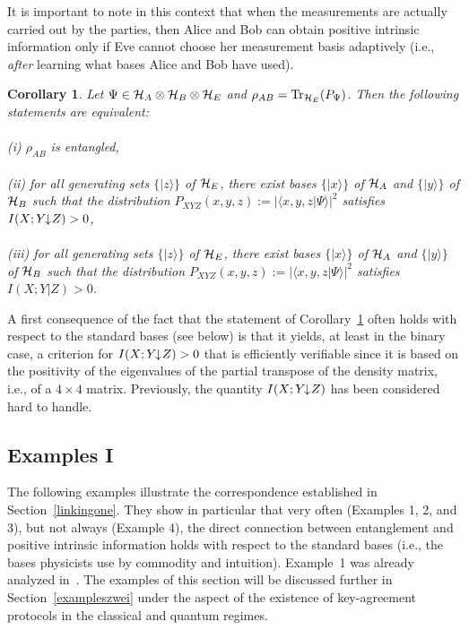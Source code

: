 \documentclass{article}
\newtheorem{cor}[theo]{Corollary}
\newcommand{\Tr}{{\rm Tr}}
\newcommand{\HA}{{\cal H}_{{A}}}
\newcommand{\HB}{{\cal H}_{{B}}}
\newcommand{\HE}{{\cal H}_{{E}}}
\newcommand{\ida}{I(X;Y\hspace{-1.3mm}\downarrow\hspace{-0.8mm} Z)}
\begin{document}
It is important to note in this context that when the measurements 
are actually carried out by the parties, then Alice and Bob can 
obtain positive intrinsic information only  if Eve cannot 
choose her measurement basis adaptively 
(i.e., {\em after\/} learning what bases
Alice and Bob have used). 


\begin{cor}\label{coreinszwei}
Let $\Psi\in\HA\otimes\HB\otimes\HE$ and $\rho_{AB}=\Tr_{\HE}(P_{\Psi})$.
Then the following statements
are equivalent:
\\ \ \\
\quad
{\it (i)}
$\rho_{AB}$ is entangled,
\\ \ \\
\quad
{\it (ii)}
for all generating sets $\{|z\rangle\}$ of $\HE$, there exist bases
$\{|x\rangle\}$ of $\HA$ and 
$\{|y\rangle\}$ of  $\HB$ such that the 
distribution  $P_{XYZ}(x,y,z):=|\langle x,y,z|\Psi\rangle|^2$ satisfies 
$\ida>0$,
\\ \ \\
\quad
{\it (iii)}
for all generating sets  $\{|z\rangle\}$ of $\HE$, there exist bases
$\{|x\rangle\}$ of $\HA$
and $\{|y\rangle\}$ of  $\HB$ such that the 
distribution  $P_{XYZ}(x,y,z):=|\langle x,y,z|\Psi\rangle|^2$ satisfies 
$I(X;Y|Z)>0$.
\end{cor}


A first consequence of the fact that the statement of 
Corollary~\ref{coreinszwei} often holds
with respect to the standard bases (see below) is that it yields, at least 
in the binary case, a criterion for $\ida>0$ that is efficiently verifiable 
since it is based on the positivity of the eigenvalues of 
the partial transpose of the density matrix, i.e., of 
a $4\times 4$ matrix. 
Previously, the quantity $\ida$ has been considered hard to handle.





\subsection{Examples I}
\label{exampleseins}

The following examples illustrate the correspondence established in 
Section~\ref{linkingone}. 
They show in particular that very
often (Examples 1, 2, and
3), but not always (Example 4), the direct connection between 
entanglement and positive intrinsic information holds with respect 
to the standard bases (i.e., the bases physicists use by commodity
and intuition).
Example~1 was already analyzed in~\cite{giswol99}. 
The  examples of this section will be  discussed further   in 
Section~\ref{exampleszwei} under the aspect of the existence of key-agreement 
protocols in the classical and quantum regimes.
\ \\
\end{document}
